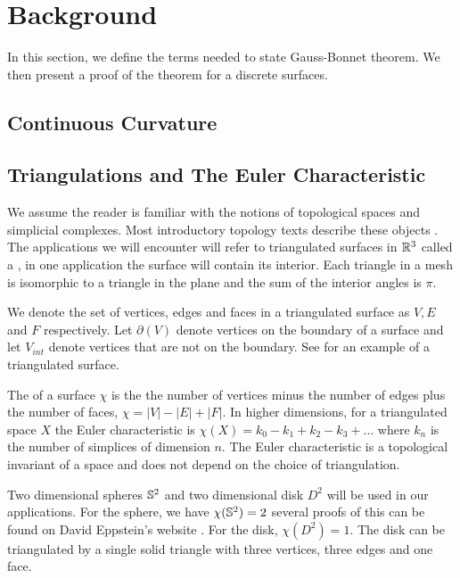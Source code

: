 \section{Background}\label{sec:background}
\label{sec:cast}

In this section, we define the terms needed to state Gauss-Bonnet theorem.
We then present a proof of the theorem for a discrete surfaces.


\subsection{Continuous Curvature}


\subsection{Triangulations and The Euler Characteristic}

We assume the reader is familiar with the notions
of topological spaces and simplicial complexes.
Most introductory topology texts describe these objects \cite{jm08,munkres}.
The applications we will encounter will refer to triangulated surfaces in $\mathbb{R}^3$
called a , in one application the surface will contain its interior.
Each triangle in a mesh is isomorphic to a triangle in the plane and the sum
of the interior angles is $\pi$.


We denote the set of vertices, edges and faces in a triangulated surface as 
$V, E$ and $F$ respectively.
Let $\partial(V)$ denote vertices on the boundary of a surface and let $V_{int}$ 
denote vertices that are not on the boundary.
See  for an example of a triangulated surface.



The  of a surface $\chi$ is the 
the number of vertices minus the number of edges plus  the number of faces, $\chi=|V|-|E|+|F|.$
In higher dimensions, for a triangulated space $X$ the Euler characteristic is 
$\chi(X)=k_0-k_1+k_2-k_3+\ldots$ where $k_n$ is the number of simplices of dimension $n.$
The Euler characteristic is a topological invariant of a space
and does not depend on the choice of triangulation.


Two dimensional spheres $\mathbb{S}^2$ and two dimensional disk $D^2$ 
will be used in our applications.
For the sphere, we have $\chi(\mathbb{S}^2)=2$ 
several proofs of this can be found on David Eppstein's website \cite{eppstein-proofs}.
For the disk, $\chi(D^2)=1$. The disk can be triangulated by
a single solid triangle with three vertices, three edges and one face.



